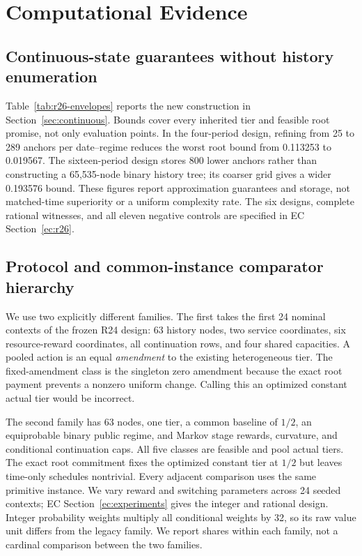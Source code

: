 \documentclass[11pt,letterpaper]{article}
\theoremstyle{definition}\newtheorem{assumption}[theorem]{Assumption}
\begin{document}


\section{Computational Evidence}\label{sec:evidence}
\subsection{Continuous-state guarantees without history enumeration}
Table~\ref{tab:r26-envelopes} reports the new construction in Section~\ref{sec:continuous}. Bounds cover every inherited tier and feasible root promise, not only evaluation points. In the four-period design, refining from 25 to 289 anchors per date--regime reduces the worst root bound from 0.113253 to 0.019567. The sixteen-period design stores 800 lower anchors rather than constructing a 65,535-node binary history tree; its coarser grid gives a wider 0.193576 bound. These figures report approximation guarantees and storage, not matched-time superiority or a uniform complexity rate. The six designs, complete rational witnesses, and all eleven negative controls are specified in EC Section~\ref{ec:r26}.


\subsection{Protocol and common-instance comparator hierarchy}
We use two explicitly different families. The first takes the first 24 nominal contexts of the frozen R24 design: 63 history nodes, two service coordinates, six resource-reward coordinates, all continuation rows, and four shared capacities. A pooled action is an equal \emph{amendment} to the existing heterogeneous tier. The fixed-amendment class is the singleton zero amendment because the exact root payment prevents a nonzero uniform change. Calling this an optimized constant actual tier would be incorrect.

The second family has 63 nodes, one tier, a common baseline of $1/2$, an equiprobable binary public regime, and Markov stage rewards, curvature, and conditional continuation caps. All five classes are feasible and pool actual tiers. The exact root commitment fixes the optimized constant tier at $1/2$ but leaves time-only schedules nontrivial. Every adjacent comparison uses the same primitive instance. We vary reward and switching parameters across 24 seeded contexts; EC Section~\ref{ec:experiments} gives the integer and rational design. Integer probability weights multiply all conditional weights by 32, so its raw value unit differs from the legacy family. We report shares within each family, not a cardinal comparison between the two families.
\end{document}
